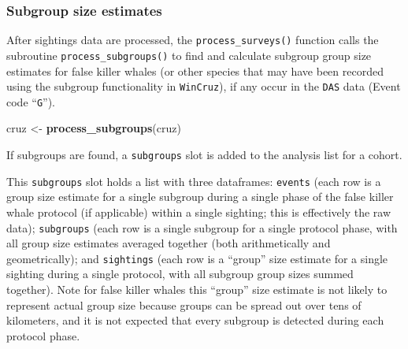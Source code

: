 \documentclass[
]{book}
\newenvironment{Shaded}{\begin{snugshade}}{\end{snugshade}}
\newcommand{\DecValTok}[1]{\textcolor[rgb]{0.00,0.00,0.81}{#1}}
\newcommand{\FunctionTok}[1]{\textcolor[rgb]{0.13,0.29,0.53}{\textbf{#1}}}
\newcommand{\NormalTok}[1]{#1}
\newcommand{\OtherTok}[1]{\textcolor[rgb]{0.56,0.35,0.01}{#1}}
\newcommand{\SpecialCharTok}[1]{\textcolor[rgb]{0.81,0.36,0.00}{\textbf{#1}}}
\newcommand{\StringTok}[1]{\textcolor[rgb]{0.31,0.60,0.02}{#1}}
\begin{document}
\hypertarget{subgroups}{%
\subsubsection*{Subgroup size estimates}\label{subgroups}}

After sightings data are processed, the \texttt{process\_surveys()} function calls the subroutine \texttt{process\_subgroups()} to find and calculate subgroup group size estimates for false killer whales (or other species that may have been recorded using the subgroup functionality in \texttt{WinCruz}), if any occur in the \texttt{DAS} data (Event code ``\texttt{G}'').

\begin{Shaded}
\begin{Highlighting}[]
\NormalTok{cruz }\OtherTok{\textless{}{-}} \FunctionTok{process\_subgroups}\NormalTok{(cruz) }
\end{Highlighting}
\end{Shaded}

If subgroups are found, a \texttt{subgroups} slot is added to the analysis list for a cohort.

\begin{Shaded}
\end{Shaded}

This \texttt{subgroups} slot holds a list with three dataframes: \texttt{events} (each row is a group size estimate for a single subgroup during a single phase of the false killer whale protocol (if applicable) within a single sighting; this is effectively the raw data); \texttt{subgroups} (each row is a single subgroup for a single protocol phase, with all group size estimates averaged together (both arithmetically and geometrically); and \texttt{sightings} (each row is a ``group'' size estimate for a single sighting during a single protocol, with all subgroup group sizes summed together). Note for false killer whales this ``group'' size estimate is not likely to represent actual group size because groups can be spread out over tens of kilometers, and it is not expected that every subgroup is detected during each protocol phase.
\end{document}
